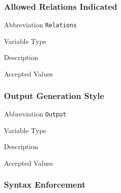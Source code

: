 \subsubsection{Allowed Relations Indicated}
\label{subsec:relations}

\begin{AlignedDesc}
  \item[Abbreviation] \texttt{Relations}

  \item[Variable Type]

  \item[Description]

  \item[Accepted Values]

  \begin{AlignedDesc}
    \item[\textellipsis]
  \end{AlignedDesc}

\end{AlignedDesc}

\subsubsection{Output Generation Style}
\label{subsec:output}

\begin{AlignedDesc}
  \item[Abbreviation] \texttt{Output}

  \item[Variable Type]

  \item[Description]

  \item[Accepted Values]

  \begin{AlignedDesc}
    \item[\textellipsis]
  \end{AlignedDesc}

\end{AlignedDesc}

\subsubsection{Syntax Enforcement}
\label{subsec:syntax}

